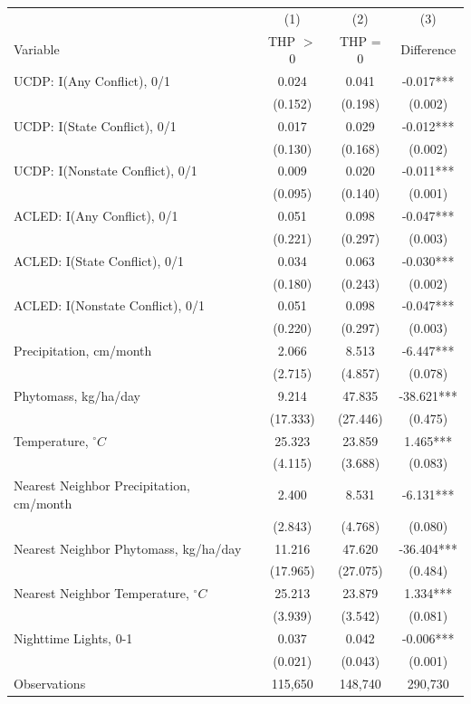 \begin{tabular}{l*{3}c}
\toprule
 & (1) & (2) & (3) \\
Variable & THP $>$ 0 & THP = 0 & Difference \\
\midrule
UCDP: I(Any Conflict), 0/1&0.024&0.041&-0.017***\\
&(0.152)&(0.198)&(0.002)\\
UCDP: I(State Conflict), 0/1&0.017&0.029&-0.012***\\
&(0.130)&(0.168)&(0.002)\\
UCDP: I(Nonstate Conflict), 0/1&0.009&0.020&-0.011***\\
&(0.095)&(0.140)&(0.001)\\
ACLED: I(Any Conflict), 0/1&0.051&0.098&-0.047***\\
&(0.221)&(0.297)&(0.003)\\
ACLED: I(State Conflict), 0/1&0.034&0.063&-0.030***\\
&(0.180)&(0.243)&(0.002)\\
ACLED: I(Nonstate Conflict), 0/1&0.051&0.098&-0.047***\\
&(0.220)&(0.297)&(0.003)\\
Precipitation, cm/month&2.066&8.513&-6.447***\\
&(2.715)&(4.857)&(0.078)\\
Phytomass, kg/ha/day&9.214&47.835&-38.621***\\
&(17.333)&(27.446)&(0.475)\\
Temperature, $^{\circ}C$&25.323&23.859&1.465***\\
&(4.115)&(3.688)&(0.083)\\
Nearest Neighbor Precipitation, cm/month&2.400&8.531&-6.131***\\
&(2.843)&(4.768)&(0.080)\\
Nearest Neighbor Phytomass, kg/ha/day&11.216&47.620&-36.404***\\
&(17.965)&(27.075)&(0.484)\\
Nearest Neighbor Temperature, $^{\circ}C$&25.213&23.879&1.334***\\
&(3.939)&(3.542)&(0.081)\\
Nighttime Lights, 0-1&0.037&0.042&-0.006***\\
&(0.021)&(0.043)&(0.001)\\
\midrule
Observations & 115,650 & 148,740 & 290,730 \\
\bottomrule
\end{tabular}
